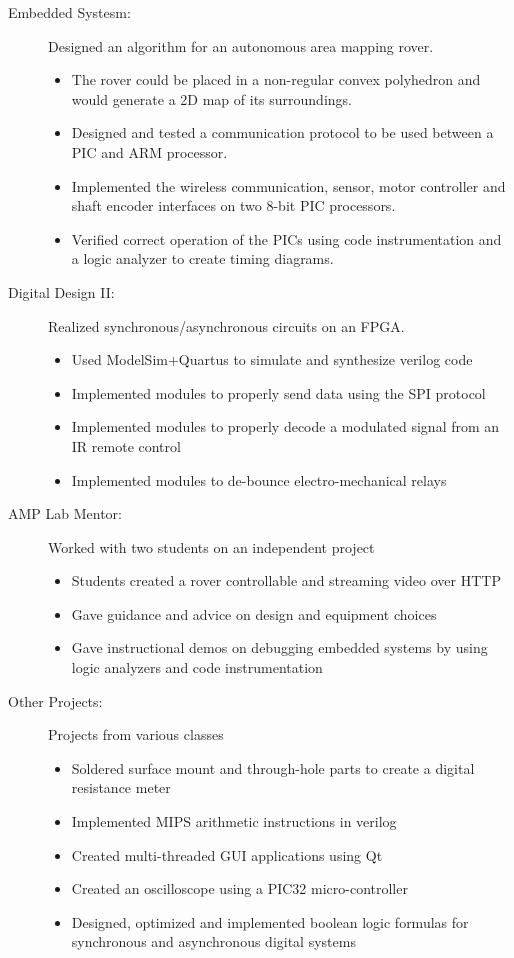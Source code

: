 \documentclass[letterpaper,11pt]{article}
\newcommand{\resitem}[1]{\item #1 \vspace{-2pt}}
\newcommand{\resheading}[1]{{\large \parashade[.9]{sharpcorners}{\textbf{#1 \vphantom{p\^{E}}}}}}
\begin{document}
\resheading{School Projects}
\begin{description}
  \item[Embedded Systesm:]
    Designed an algorithm for an autonomous area mapping
    rover.
    \begin{itemize} 
        \resitem{The rover could be placed in a non-regular convex polyhedron and
        would generate a 2D map of its surroundings.}
        \resitem{Designed and tested a communication protocol to be used
        between a PIC and ARM processor.}
        \resitem{Implemented the wireless communication, sensor, motor controller and shaft
        encoder interfaces on two 8-bit PIC processors.}
        \resitem{Verified correct operation of the PICs using code
        instrumentation and a logic analyzer to create timing diagrams.}
    \end{itemize}
  \item[Digital Design II:] Realized synchronous/asynchronous circuits on an
    FPGA.
    \begin{itemize}
      \resitem{Used ModelSim+Quartus to simulate and synthesize verilog code}
      \resitem{Implemented modules to properly send data using the SPI protocol}
      \resitem{Implemented modules to properly decode a modulated signal from an
        IR remote control}
      \resitem{Implemented modules to de-bounce electro-mechanical relays}
    \end{itemize}

  \item[AMP Lab Mentor:] Worked with two students on an independent project
    \begin{itemize}
        \resitem {Students created a rover controllable and streaming video over HTTP}
      \resitem{Gave guidance and advice on design and equipment
        choices}
      \resitem{Gave instructional demos on debugging embedded systems by using logic analyzers and code instrumentation}
  \end{itemize}

  \item[Other Projects:] Projects from various classes
    \begin{itemize}
      \resitem{Soldered surface mount and through-hole parts to create a digital
      resistance meter}
      \resitem{Implemented MIPS arithmetic instructions in verilog}
      \resitem{Created multi-threaded GUI applications using Qt}
      \resitem{Created an oscilloscope using a PIC32 micro-controller}
      \resitem{Designed, optimized and implemented boolean logic formulas for
      synchronous and asynchronous digital systems}
    \end{itemize}

\end{description}
\end{document}
